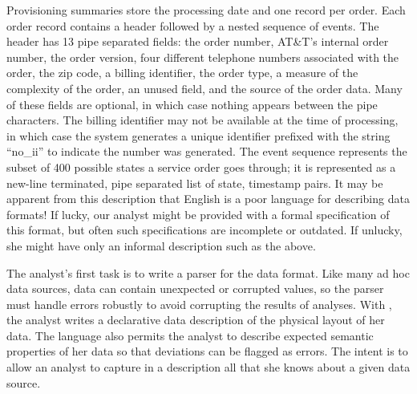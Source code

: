 Provisioning summaries store the processing date and one record per
order.  Each order record contains a header followed by a nested
sequence of events.  The header has 13 pipe separated fields: the
order number, AT\&T's internal order number, the order version, four
different telephone numbers associated with the order, the zip code, a
billing identifier, the order type, a measure of the complexity of the
order, an unused field, and the source of the order data.  Many of
these fields are optional, in which case nothing appears between the
pipe characters.  The billing identifier may not be available at the
time of processing, in which case the system generates a unique
identifier prefixed with the string ``no\_ii'' to indicate the number
was generated. The event sequence represents the subset of 400
possible states a service order goes through; it is represented as a
new-line terminated, pipe separated list of state, timestamp pairs.
It may be apparent from this description that English is a poor
language for describing data formats!  If lucky, our analyst might be
provided with a formal specification of this format, but often such
specifications are incomplete or outdated.  If unlucky, she might have
only an informal description such as the above.

The analyst's first task is to write a parser for the \dibbler{} data
format.  Like many ad hoc data sources, \dibbler{} data can contain
unexpected or corrupted values, so the parser must handle errors
robustly to avoid corrupting the results of analyses.  With \pads{},
the analyst writes a declarative data description of the physical
layout of her data.  The language also permits the analyst to describe
expected semantic properties of her data so that deviations can be
flagged as errors. The intent is to allow an analyst to capture in a
\pads{} description all that she knows about a given data source.

